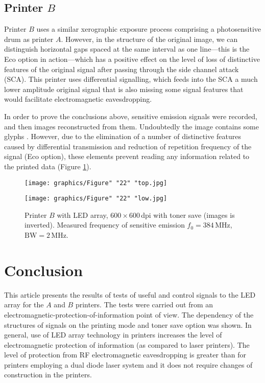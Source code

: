 \documentclass[letterpaper,journal]{ieeetran}
\begin{document}
\subsection{Printer $B$}

Printer $B$ uses a similar xerographic exposure process comprising a
photosensitive drum as printer $A$. However, in the structure of the original
image, we can distinguish horizontal gaps spaced at the same interval as one
line---this is the Eco option in action---which has a positive effect on the
level of
loss of distinctive features of the original signal after passing through the
side channel attack (SCA). This printer uses differential signalling, which
feeds into the SCA a much lower amplitude original signal that is also
missing some signal features that would facilitate electromagnetic
eavesdropping.

In order to prove the conclusions above, sensitive emission signals were
recorded, and then images reconstructed from them. Undoubtedly the image
contains some glyphs \cite{Jalilian2014a}. However, due to the
elimination of a number of distinctive features caused by differential
transmission and reduction of repetition frequency of the signal (Eco
option), these elements prevent reading any information related to the
printed data (Figure \ref{figure:Figure_22}).

\begin{figure}[ht]
    \centering
    \texttt{[image: graphics/Figure" "22" "top.jpg]}

    \bigskip

    \texttt{[image: graphics/Figure" "22" "low.jpg]}
    \caption{Printer $B$ with LED array, $600\times 600$\,dpi with toner
        save (images is inverted). Measured frequency of sensitive emission
        $f_0 = 384$\,\si{\mega\hertz}, $\text{BW}=2$\,\si{\mega\hertz}.}
    \label{figure:Figure_22}
\end{figure}

\section{Conclusion}

This article presents the results of tests of useful and control signals to
the LED array for the $A$ and $B$ printers. The tests were carried out from
an electromagnetic-protection-of-information point of view. The dependency of
the structures of signals on the printing mode and toner save option was
shown. In general, use of LED array technology in printers increases the
level of electromagnetic protection of information (as compared to laser
printers). The level of protection from RF electromagnetic eavesdropping is
greater than for printers employing a dual diode laser system
\cite{Kubiak2018c} and it does not require changes of construction in the
printers.
\end{document}

